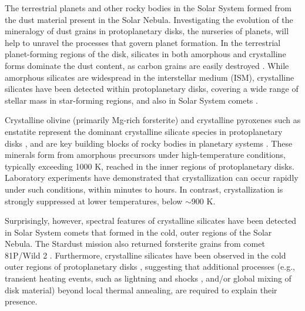 \documentclass[pdflatex,sn-mathphys-num]{sn-jnl}
\theoremstyle{thmstyleone}
\theoremstyle{thmstyletwo}
\theoremstyle{thmstylethree}
\begin{document}
\begin{bibunit}
The terrestrial planets and other rocky bodies in the Solar System formed from the dust material present in the Solar Nebula.
Investigating the evolution of the mineralogy of dust grains in protoplanetary disks, the nurseries of planets, will help to unravel the processes that govern planet formation.
In the terrestrial planet-forming regions of the disk, silicates in both amorphous and crystalline forms dominate the dust content, as carbon grains are easily destroyed \citep{jeLee2010, Anderson2017}.
While amorphous silicates are widespread in the interstellar medium (ISM),
crystalline silicates have been detected within protoplanetary disks, covering a wide range of stellar mass \citep{Bouwman2001, vanBoekel2003, vanBoekel2005, Juhasz2010, Meeus2003, Abraham2009, Olofsson2009, Furlan2011, Jang2024PDS} in star-forming regions, and also in Solar System comets \citep{Hanner1994, Hayward2000, Wooden2002, Shinnaka2018}.

Crystalline olivine (primarily Mg-rich forsterite) and crystalline pyroxenes such as enstatite represent the dominant crystalline silicate species in protoplanetary disks \citep{Bouwman2001, vanBoekel2003, vanBoekel2005, Apai2005, Olofsson2009, Juhasz2010, Jang2024PDS}, and are key building blocks of rocky bodies in planetary systems \citep{Raymond2022}. These minerals form from amorphous precursors under high-temperature conditions, typically exceeding 1000 K, reached in the inner regions of protoplanetary disks. Laboratory experiments \citep[e.g.,][]{Fabian2000, Hallenbeck1998} have demonstrated that crystallization can occur rapidly under such conditions, within minutes to hours. In contrast, crystallization is strongly suppressed at lower temperatures, below $\sim$900 K.

Surprisingly, however, spectral features of crystalline silicates have been detected in Solar System comets \citep{Hanner1994, Hayward2000, Wooden2002, Shinnaka2018} that formed in the cold, outer regions of the Solar Nebula. The Stardust mission also returned forsterite grains from comet 81P/Wild 2 \citep{Nuth2006}. Furthermore, crystalline silicates have been observed in the cold outer regions of protoplanetary disks \citep{Olofsson2009, Maaskant2014}, suggesting that additional processes (e.g., transient heating events, such as lightning \citep{Pilipp1998} and shocks \citep{Harker2002}, and/or global mixing of disk material) beyond local thermal annealing, are required to explain their presence.


\end{bibunit}
\end{document}
